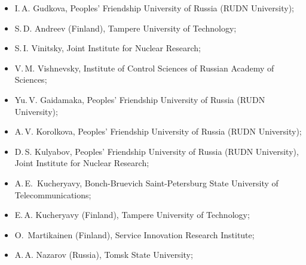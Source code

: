 \begin{itemize}
\item I.\,A. Gudkova, Peoples’ Friendship University of Russia (RUDN University);
\item S.\,D. Andreev (Finland), Tampere University of Technology;
\item S.\,I. Vinitsky, Joint Institute for Nuclear Research;
\item V.\,M. Vishnevsky, Institute of Control Sciences of Russian
  Academy of Sciences;
\item Yu.\,V. Gaidamaka, Peoples’ Friendship University of Russia (RUDN University);
\item A.\,V. Korolkova, Peoples’ Friendship University of Russia (RUDN University);
\item D.\,S. Kulyabov, Peoples’ Friendship University of Russia (RUDN
  University), Joint Institute for Nuclear Research;
\item A.\,E.~Kucheryavy, Bonch-Bruevich Saint-Petersburg State
University of Tele\-com\-muni\-ca\-tions;
\item E.\,A. Kucheryavy (Finland), Tampere University of Technology;
\item O.~Martikainen (Finland), Service Innovation Research Institute;
\item A.\,A. Nazarov (Russia), Tomsk State University;

\end{itemize}
